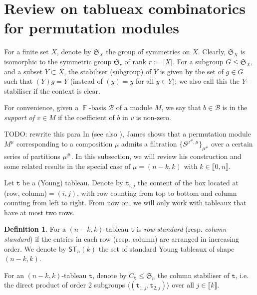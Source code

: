 \documentclass[a4paper]{amsart}
\numberwithin{equation}{subsection}
\theoremstyle{definition}
\newtheorem{definition}[theorem]{Definition}
\DeclareMathOperator{\F}{\mathbb{F}}
\newcommand{\interval}[1]{\llbracket #1 \rrbracket}
\newcommand{\comm}[1]{{\color{red}#1}}
\newcommand{\tbx}{\mathtt{t}}
\newcommand{\ST}{\mathsf{ST}}
\numberwithin{equation}{subsection}
\begin{document}
\section{Review on tablueax combinatorics for permutation modules}\label{subsec:James}

For a finite set $X$, denote by $\mathfrak{S}_{X}$ the group of symmetries on $X$.  Clearly, $\mathfrak{S}_{X}$ is isomorphic to the symmetric group $\mathfrak{S}_{r}$ of rank $r:=|X|$.  For a subgroup $G\leq \mathfrak{S}_X$, and a subset $Y\subset X$, the stabiliser (subgroup) of $Y$ is given by the set of $g\in G$ such that $(Y)g=Y$ (instead of $(y)=y$ for all $y\in Y$); we also call this the $Y$-stabiliser if the context is clear.

For convenience, given a $\F$-basis $\mathcal{B}$ of a module $M$, we say that $b\in\mathcal{B}$ is in the \emph{support of $v\in M$} if the coefficient of $b$ in $v$ is non-zero.

\comm{TODO: rewrite this para} In \cite{James2} (see also \cite[Chapter 17]{James3}), James shows that a permutation module $M^\mu$ corresponding to a composition $\mu$ admits a filtration $\{S^{\mu^\#,\mu}\}_{\mu^\#}$ over a certain series of partitions $\mu^\#$.
In this subsection, we will review his construction and some related results in the special case of $\mu = (n-k,k)$ with $k\in\interval{0,n}$.

\medskip

Let $\tbx$ be a (Young) tableau.  Denote by $\tbx_{i,j}$ the content of the box located at (row, column)$=(i,j)$, with row counting from top to bottom and column counting from left to right.
From now on, we will only work with tableaux that have at most two rows.

\begin{definition}\label{def:tab}
For a $(n-k,k)$-tableau $\tbx$ is \emph{row-standard} (resp. \emph{column-standard}) if the entries in each row (resp. column) are arranged in increasing order.
We denote by $\ST_n(k)$ the set of standard Young tableaux of shape $(n-k,k)$.

For an $(n-k,k)$-tableau $\tbx$, denote by $C_{\tbx}\leq \mathfrak{S}_n$ the column stabiliser of $\tbx$, i.e. the direct product of order 2 subgroups $\langle (\tbx_{1,j}, \tbx_{2,j}) \rangle$ over all $j\in\interval{k}$.
\end{definition}
\end{document}
